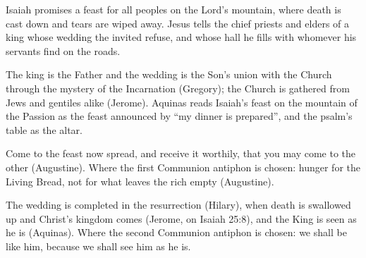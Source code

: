 \begin{fourSenses}
\item[Literal.] Isaiah promises a feast for all peoples on the Lord's mountain,
where death is cast down and tears are wiped away. Jesus tells the chief
priests and elders of a king whose wedding the invited refuse, and whose hall
he fills with whomever his servants find on the roads.

\item[Allegorical.] The king is the Father and the wedding is the Son's union
with the Church through the mystery of the Incarnation (Gregory); the Church
is gathered from Jews and gentiles alike (Jerome). Aquinas reads Isaiah's
feast on the mountain of the Passion as the feast announced by ``my dinner is
prepared'', and the psalm's table as the altar.

\item[Moral.] Come to the feast now spread, and receive it worthily, that you
may come to the other (Augustine). Where the first Communion antiphon is
chosen: hunger for the Living Bread, not for what leaves the rich empty
(Augustine).

\item[Anagogical.] The wedding is completed in the resurrection (Hilary), when
death is swallowed up and Christ's kingdom comes (Jerome, on Isaiah 25:8), and
the King is seen as he is (Aquinas). Where the second Communion antiphon is
chosen: we shall be like him, because we shall see him as he is.
\end{fourSenses}
